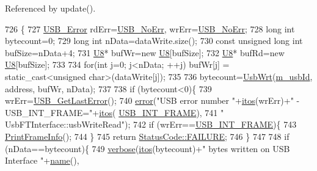 Referenced by update().


\begin{DoxyCode}
726                                                                     \{
727   \hyperlink{LALUsbML_8h_aa7e5a2302774d5aa1d48a2a1cfc46e86}{USB\_Error} rdErr=\hyperlink{LALUsbML_8h_ab44759ae95dd86cbc2855adf525c43cd}{USB\_NoErr}, wrErr=\hyperlink{LALUsbML_8h_ab44759ae95dd86cbc2855adf525c43cd}{USB\_NoErr};
728   \textcolor{keywordtype}{long} \textcolor{keywordtype}{int} bytecount=0;
729   \textcolor{keywordtype}{long} \textcolor{keywordtype}{int} nData=dataWrite.size();
730   \textcolor{keyword}{const} \textcolor{keywordtype}{unsigned} \textcolor{keywordtype}{long} \textcolor{keywordtype}{int} bufSize=nData+4;
731   \hyperlink{ICECALv3_8h_a3cb25ca6f51f003950f9625ff05536fc}{U8}* bufWr=\textcolor{keyword}{new} \hyperlink{ICECALv3_8h_a3cb25ca6f51f003950f9625ff05536fc}{U8}[bufSize];
732   \hyperlink{ICECALv3_8h_a3cb25ca6f51f003950f9625ff05536fc}{U8}* bufRd=\textcolor{keyword}{new} \hyperlink{ICECALv3_8h_a3cb25ca6f51f003950f9625ff05536fc}{U8}[bufSize];
733 
734   \textcolor{keywordflow}{for}(\textcolor{keywordtype}{int} j=0; j<nData; ++j) bufWr[j] = static\_cast<unsigned char>(dataWrite[j]);
735 
736   bytecount=\hyperlink{LALUsbML_8h_a417eaf04d96bd2d3fca0111f8003bcb0}{UsbWrt}(\hyperlink{classUsbFTInterface_a91df5c0547e8be460bc087e27afe05aa}{m\_usbId}, address, bufWr, nData);
737 
738   \textcolor{keywordflow}{if} (bytecount<0)\{
739     wrErr=\hyperlink{LALUsbML_8h_a1662b77c9968848acf173f6f9c765ddd}{USB\_GetLastError}();
740     \hyperlink{classObject_a204a95f57818c0f811933917a30eff45}{error}(\textcolor{stringliteral}{"USB error number "}+\hyperlink{Tools_8h_af330027dbdafb9a30768b3613c553e60}{itos}(wrErr)+\textcolor{stringliteral}{" - USB\_INT\_FRAME="}+\hyperlink{Tools_8h_af330027dbdafb9a30768b3613c553e60}{itos}(
      \hyperlink{LALUsbML_8h_a68260f9cf3649507d12904cfa1592c11afd1c409187b1dfd3d66887a5e07e7ed3}{USB\_INT\_FRAME}),
741             \textcolor{stringliteral}{" UsbFTInterface::usbWriteRead"});
742     \textcolor{keywordflow}{if} (wrErr==\hyperlink{LALUsbML_8h_a68260f9cf3649507d12904cfa1592c11afd1c409187b1dfd3d66887a5e07e7ed3}{USB\_INT\_FRAME})\{
743       \hyperlink{LALUsbML_8h_ab3398c17204ba7fb4b47eb9bbf4ba94e}{PrintFrameInfo}();
744     \} 
745     \textcolor{keywordflow}{return} \hyperlink{classStatusCode_a6f565cbeadc76d14c72f047e5e85eb4ba3da73d4c469762eb9d3c960368252b26}{StatusCode::FAILURE};
746   \}
747 
748   \textcolor{keywordflow}{if} (nData==bytecount)\{
749     \hyperlink{classObject_a83d2db2df682907ea1115ad721c1c4a1}{verbose}(\hyperlink{Tools_8h_af330027dbdafb9a30768b3613c553e60}{itos}(bytecount)+\textcolor{stringliteral}{" bytes written on USB Interface "}+\hyperlink{classObject_a300f4c05dd468c7bb8b3c968868443c1}{name}(),

\end{DoxyCode}
